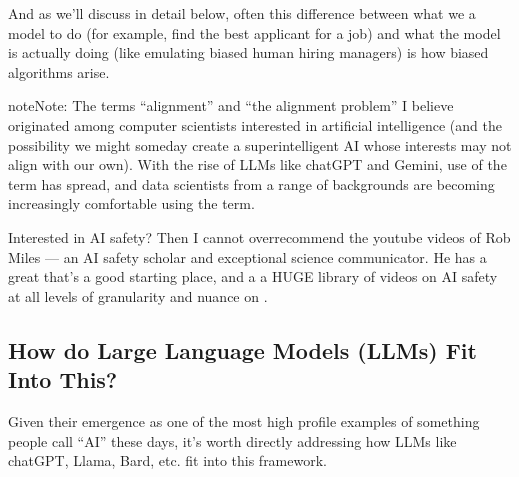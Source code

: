 \documentclass[letterpaper,10pt,english]{jupyterBook}
\begin{document}
\sphinxAtStartPar
And as we’ll discuss in detail below, often this difference between what we  a model to do (for example, find the best applicant for a job) and what the model is actually doing (like emulating biased human hiring managers) is how biased algorithms arise.

\begin{sphinxadmonition}{note}{Note:}
\sphinxAtStartPar
The terms “alignment” and “the alignment problem” I believe originated among computer scientists interested in artificial intelligence (and the possibility we might someday create a super\sphinxhyphen{}intelligent AI whose interests may not align with our own). With the rise of LLMs like chatGPT and Gemini, use of the term has spread, and data scientists from a range of backgrounds are becoming increasingly comfortable using the term.

\sphinxAtStartPar
Interested in AI safety? Then I cannot over\sphinxhyphen{}recommend the youtube videos of Rob Miles — an AI safety scholar and exceptional science communicator. He has a great  that’s a good starting place, and a a HUGE library of videos on AI safety at all levels of granularity and nuance on .
\end{sphinxadmonition}


\subsection{How do Large Language Models (LLMs) Fit Into This?}
\label{\detokenize{30_questions/23_passive_internal_alignment_and_bias:how-do-large-language-models-llms-fit-into-this}}
\sphinxAtStartPar
Given their emergence as one of the most high profile examples of something people call “AI” these days, it’s worth directly addressing how LLMs like chatGPT, Llama, Bard, etc. fit into this framework.
\end{document}
